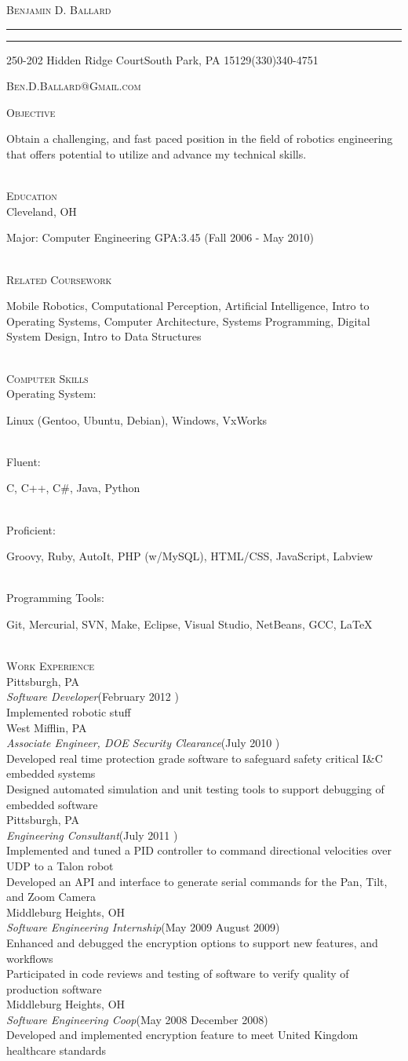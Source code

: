 \documentclass[11pt,letterpaper]{article}
\makeatletter
\newcommand{\name}{\textsc{Benjamin D. Ballard}}
\newcommand{\address}{\footnotesize 250-202 Hidden Ridge Court\hspace{2px}\textbullet\hspace{2px}South Park, PA 15129\hspace{2px}\textbullet\hspace{2px}(330)340-4751}
\newcommand{\email}{\textsc{Ben.D.Ballard@Gmail.com}}
\newcommand{\SkillItem}[2]{\hspace*{.5in}#1\hfill\begin{minipage}[t]{5.6in} #2 \end{minipage}\\}
\newcommand{\SectionHeader}[1]{\textsc{#1} \vspace{-2px}\\}
\newcommand{\CollegeHeader}[2]{\hspace*{.52in}{\bf#1} \hfill #2 \\}
\newcommand{\CompanyHeader}[4]{\hspace*{.52in}{\bf#1} \hfill #2 \\\hspace*{.5in}\emph{#3}\hfill (#4) \\}
\newcommand{\ResumeItem}[1]{\hspace*{.5in}\textopenbullet\hspace*{.2in}#1\\}
\newcommand{\TextBlock}[1]
{\hspace*{.5in} \begin{minipage}[t]{\textwidth -.5in} #1 \end{minipage}\\}
\newcommand{\ResumeHeader}{
\begin{center}
{

\linespread{0}

\Huge{\textsc{\name}}

\small
\nointerlineskip \vspace{4px}%
  \hspace{\fill}
\rule{\textwidth}{1px}
 \par\nointerlineskip \vspace{\baselineskip}
\nointerlineskip \vspace{0px}%
  \hspace{\fill}
\rule{\textwidth}{1px}
 \par \nointerlineskip \vspace{1px}
 \address \par \nointerlineskip \vspace{\baselineskip}
 \email
}
\end{center}
}
\makeatother
\begin{document}
\ResumeHeader
\vspace{-13px}

\SectionHeader{Objective}
\TextBlock{Obtain a challenging, and fast paced position in the field of robotics engineering that offers potential to utilize and advance my technical skills.}
\SectionHeader{Education}
\CollegeHeader{Case Western Reserve University}{Cleveland, OH}
\TextBlock{Major: Computer Engineering GPA:3.45 \hfill (Fall 2006 - May 2010)}
\SectionHeader{Related Coursework}
\TextBlock{Mobile Robotics, Computational Perception, Artificial Intelligence, Intro to Operating Systems, Computer Architecture, Systems Programming, Digital System Design, Intro to Data Structures}
\SectionHeader{Computer Skills}
\SkillItem{Operating System:}{Linux (Gentoo, Ubuntu, Debian), Windows, VxWorks}
\SkillItem{Fluent:}{C, C++, C\#, Java, Python}
\SkillItem{Proficient:}{Groovy, Ruby, AutoIt, PHP (w/MySQL), HTML/CSS, JavaScript, Labview}
\SkillItem{Programming Tools:}{Git, Mercurial, SVN, Make, Eclipse, Visual Studio, NetBeans, GCC, \LaTeX}
\SectionHeader{Work Experience}
\CompanyHeader{Seegrid}{Pittsburgh, PA}{Software Developer}{February 2012  \textendash { Present}}
\ResumeItem{Implemented robotic stuff}
\CompanyHeader{Bechtel Marine Propulsion Company (Bettis Atomic Power Laboratory)}{West Mifflin, PA}{Associate Engineer, DOE Security Clearance}{July 2010 \textendash { February 2012}}
\ResumeItem{Developed real time protection grade software to safeguard safety critical I\&{C} embedded systems}
\ResumeItem{Designed automated simulation and unit testing tools to support debugging of embedded software}
\CompanyHeader{Carnegie Robotics}{Pittsburgh, PA}{Engineering Consultant}{July 2011 \textendash { August 2011}}
\ResumeItem{Implemented and tuned a PID controller to command directional velocities over UDP to a Talon robot}
\ResumeItem{Developed an API and interface to generate serial commands for the Pan, Tilt, and Zoom Camera}
\CompanyHeader{Codonics}{Middleburg Heights, OH}{Software Engineering Internship}{May 2009 \textendash
 { }August 2009}
 \ResumeItem{Enhanced and debugged the encryption options to support new features, and workflows}
 \ResumeItem{Participated in code reviews and testing of software to verify quality of production software}
 \CompanyHeader{Codonics}{Middleburg Heights, OH}{Software Engineering Coop}{May 2008 \textendash
 { }December 2008}
 \ResumeItem{Developed and implemented encryption feature to meet United Kingdom healthcare standards}
\end{document}
